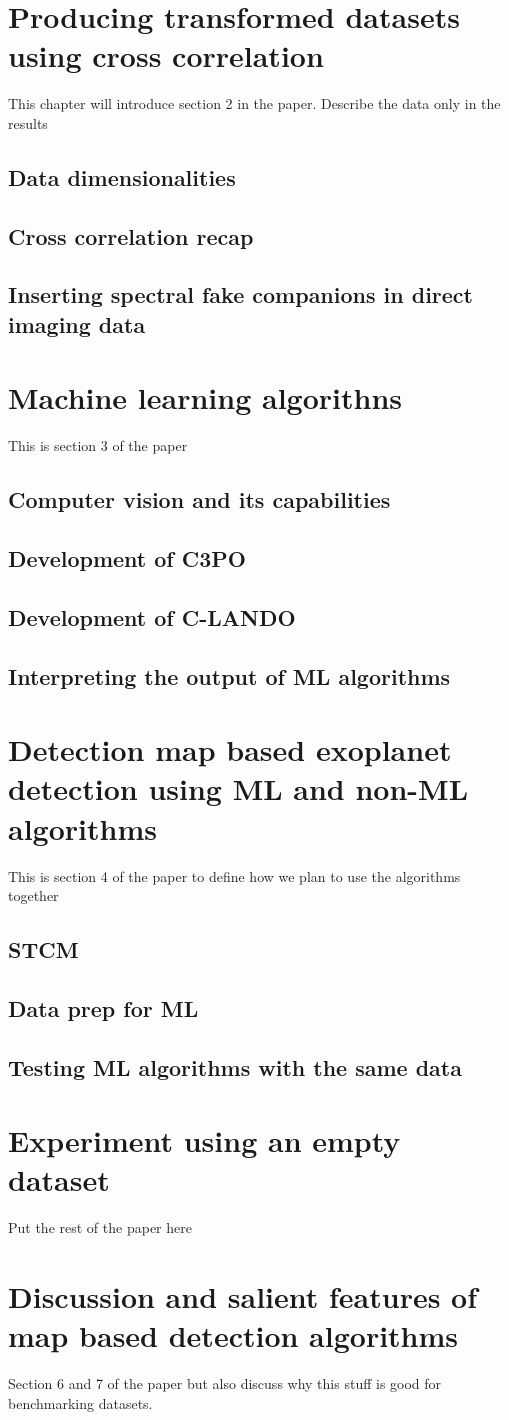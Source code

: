 \chapter{Producing transformed datasets using cross correlation }
This chapter will introduce section 2 in the paper. Describe the data only in the results
\section{Data dimensionalities }
\section{Cross correlation recap}
\section{Inserting spectral fake companions in direct imaging data}

\chapter{Machine learning algorithns}
This is section 3 of the paper
\section{Computer vision and its capabilities}
\section{Development of C3PO}
\section{Development of C-LANDO}
\section{Interpreting the output of ML algorithms}

\chapter{Detection map based exoplanet detection using ML and non-ML algorithms}
This is section 4 of the paper to define how we plan to use the algorithms together
\section{STCM}
\section{Data prep for ML}
\section{Testing ML algorithms with the same data}

\chapter{Experiment using an empty dataset}
Put the rest of the paper here
\chapter{Discussion and salient features of map based detection algorithms}
Section 6 and 7 of the paper but also discuss why this stuff is good for benchmarking datasets.
